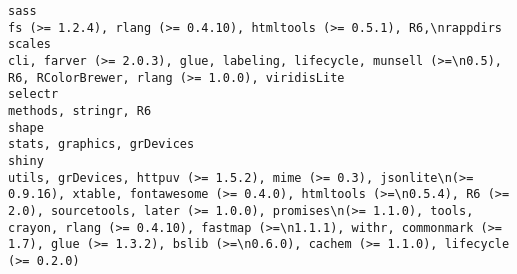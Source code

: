 \documentclass[
  letterpaper,
  DIV=11,
  numbers=noendperiod]{scrreprt}
\begin{document}
\begin{verbatim}
sass                                                                                                                                                                                                                                                                                                                                                                                                                                                                                                                                                 fs (>= 1.2.4), rlang (>= 0.4.10), htmltools (>= 0.5.1), R6,\nrappdirs
scales                                                                                                                                                                                                                                                                                                                                                                                                                                                                                               cli, farver (>= 2.0.3), glue, labeling, lifecycle, munsell (>=\n0.5), R6, RColorBrewer, rlang (>= 1.0.0), viridisLite
selectr                                                                                                                                                                                                                                                                                                                                                                                                                                                                                                                                                                                               methods, stringr, R6
shape                                                                                                                                                                                                                                                                                                                                                                                                                                                                                                                                                                                           stats, graphics, grDevices
shiny                                                                                                                                                                                                                                                   utils, grDevices, httpuv (>= 1.5.2), mime (>= 0.3), jsonlite\n(>= 0.9.16), xtable, fontawesome (>= 0.4.0), htmltools (>=\n0.5.4), R6 (>= 2.0), sourcetools, later (>= 1.0.0), promises\n(>= 1.1.0), tools, crayon, rlang (>= 0.4.10), fastmap (>=\n1.1.1), withr, commonmark (>= 1.7), glue (>= 1.3.2), bslib (>=\n0.6.0), cachem (>= 1.1.0), lifecycle (>= 0.2.0)

\end{verbatim}
\end{document}
